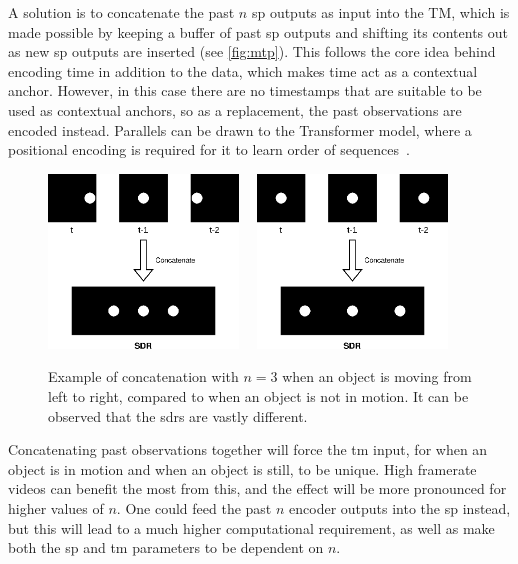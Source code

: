 A solution is to concatenate the past $n$ \gls*{sp} outputs as input into the TM, which is made possible by keeping a buffer of past \gls*{sp} outputs and shifting its contents out as new \gls*{sp} outputs are inserted (see \autoref{fig:mtp}). This follows the core idea behind encoding time in addition to the data, which makes time act as a contextual anchor. However, in this case there are no timestamps that are suitable to be used as contextual anchors, so as a replacement, the past observations are encoded instead. Parallels can be drawn to the Transformer model, where a positional encoding is required for it to learn order of sequences~\cite{transformer}.
\par
\begin{figure}[H]
    \centering
    \includegraphics[width=0.45\textwidth]{resources/methodology/temporal_concatenation.eps}
    \unskip\ \vrule\
    \includegraphics[width=0.45\textwidth]{resources/methodology/temporal_concatenation_still.eps}
    \caption[Multistep Temporal Pattern Example]{Example of concatenation with $n=3$ when an object is moving from left to right, compared to when an object is not in motion. It can be observed that the \glspl*{sdr} are vastly different.}
    \label{fig:mtp}
\end{figure}
Concatenating past observations together will force the \gls*{tm} input, for when an object is in motion and when an object is still, to be unique. High framerate videos can benefit the most from this, and the effect will be more pronounced for higher values of $n$. One could feed the past $n$ encoder outputs into the \gls*{sp} instead, but this will lead to a much higher computational requirement, as well as make both the \gls*{sp} and \gls*{tm} parameters to be dependent on $n$.

